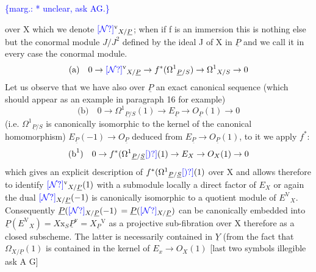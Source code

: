 \documentclass[11pt]{article}
\newcommand{\scanpage}[1]{\par\bigskip\noindent{\small\sffamily[scan #1]}\par}
\newcommand{\mspage}[1]{{\small\sffamily[p.\,#1]}}
\newcommand{\hand}[1]{\textcolor{blue}{#1}}
\newcommand{\margin}[1]{\textcolor{blue}{\{\textsf{marg.:} #1\}}}
\newcommand{\unsure}[1]{[#1?]}
\begin{document}
\margin{* unclear, ask AG.}

\clearpage
\scanpage{24/43}
\mspage{43}

over X which we denote $\hand{\unsure{\mathcal{N}}}^{\mathrm{v}}{}_{X/\underline{P}}$; when if f is an immersion this is
nothing else but the conormal module $J/J^2$ defined by the ideal J
of X in $\underline{P}$ and we call it in every case the conormal module.
\[ \text{(a)}\quad 0 \rightarrow \hand{\unsure{\mathcal{N}}}^{\mathrm{v}}{}_{X/\underline{P}} \rightarrow f^*(\Omega^1{}_{\underline{P}/S}) \rightarrow \Omega^1{}_{X/S} \rightarrow 0 \]
Let us observe that we have also over $\underline{P}$ an exact canonical
sequence (which should appear as an example in paragraph 16 for
example)
\[ \text{(b)}\quad 0 \rightarrow \Omega^1{}_{\underline{P}/S}(1) \rightarrow E_{\underline{P}} \rightarrow O_{\underline{P}}(1) \rightarrow 0 \]
(i.e. $\Omega^1{}_{\underline{P}/S}$ is canonically isomorphic to the kernel of the
canonical homomorphism) $E_{\underline{P}}(-1) \rightarrow O_{\underline{P}}$ deduced from
$E_{\underline{P}} \rightarrow O_{\underline{P}}(1)$, to it we apply $f^*$:
\[ \text{(b}^1\text{)}\quad 0 \rightarrow f^*(\Omega^1{}_{\underline{P}/\underline{S}}\hand{\unsure{)}}(1) \rightarrow E_X \rightarrow O_X(1) \rightarrow 0 \]
which gives an explicit description of $f^*(\Omega^1{}_{\underline{P}/\underline{S}}\hand{\unsure{)}}(1)$ over X and
allows therefore to identify $\hand{\unsure{\mathcal{N}}}^{\mathrm{v}}{}_{X/\underline{P}}(1)$ with a submodule locally a
direct factor of $E_X$ or again the dual $\hand{\unsure{\mathcal{N}}}{}_{X/\underline{P}}(-1)$ is canonically
isomorphic to a quotient module of $E^{\mathrm{V}}{}_X$. Consequently $\underline{P}(\hand{\unsure{\mathcal{N}}}{}_{X/\underline{P}}(-1)$
$= \underline{P}(\hand{\unsure{\mathcal{N}}}{}_{X/\underline{P}})$ can be canonically embedded into $\underline{P}(E^{\mathrm{V}}{}_X) = X\mathrm{x}_S\underline{P}^{\mathrm{v}} = X_{\underline{P}}{}^{\mathrm{V}}$
as a projective sub-fibration over X therefore as a closed
subscheme. The latter is necessarily contained in $\underline{Y}$ (from the
fact that $\Omega_{X/\underline{P}}(1)$ is contained in the kernel of $E_x \rightarrow O_X(1)$ [last
two symbols illegible ask A G]
\end{document}
